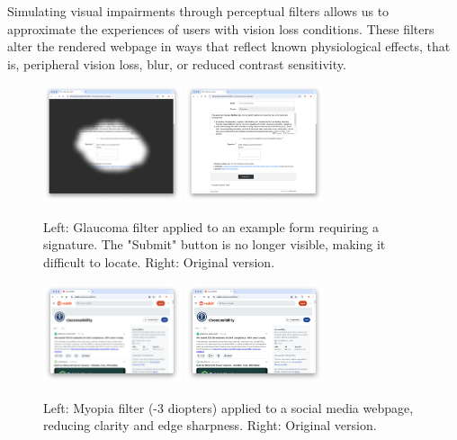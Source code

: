 Simulating visual impairments through perceptual filters allows us to approximate the experiences of users with vision loss conditions. These filters alter the rendered webpage in ways that reflect known physiological effects, that is, peripheral vision loss, blur, or reduced contrast sensitivity.

\begin{figure}
    \centering
    \includegraphics[width=115pt]{imgs/glaucoma-filter.png}
    \includegraphics[width=115pt]{imgs/no-glaucoma-filter.png}
    \caption{Left: Glaucoma filter applied to an example form requiring a signature. The "Submit" button is no longer visible, making it difficult to locate. Right: Original version.}
    \vspace{-13pt}
    \label{fig:glaucoma-filters}
\end{figure}

\begin{figure}
    \centering
    \includegraphics[width=115pt]{imgs/myopia-filter.png}
    \includegraphics[width=115pt]{imgs/no-myopia-filter.png}
    \caption{Left: Myopia filter (-3 diopters) applied to a social media webpage, reducing clarity and edge sharpness. Right: Original version.}
    \vspace{-13pt}
    \label{fig:myopia-filters}
\end{figure}

